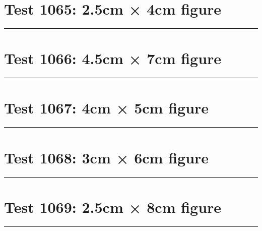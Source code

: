 \documentclass[a4paper,11pt]{article}
\begin{document}
\section*{Test 1065: 2.5cm × 4cm figure}
\begin{swarmwrap}%
  \begin{minipage}[t]{2cm}
    \centering
    \rule{\linewidth}{4cm}
  \end{minipage}%
\end{swarmwrap}%
\swarmwrapnext
\lipsum[101]
\lipsum[102]
\lipsum[103]
\section*{Test 1066: 4.5cm × 7cm figure}
\begin{swarmwrap}%
  \begin{minipage}[t]{4cm}
    \centering
    \rule{\linewidth}{7cm}
  \end{minipage}%
\end{swarmwrap}%
\swarmwrapnext
\lipsum[109]
\lipsum[110]
\lipsum[111]
\lipsum[112]
\lipsum[113]
\lipsum[114]
\section*{Test 1067: 4cm × 5cm figure}
\begin{swarmwrap}%
  \begin{minipage}[t]{4cm}
    \centering
    \rule{\linewidth}{5cm}
  \end{minipage}%
\end{swarmwrap}%
\swarmwrapnext
\lipsum[103]
\lipsum[104]
\lipsum[105]
\lipsum[106]
\lipsum[107]
\section*{Test 1068: 3cm × 6cm figure}
\begin{swarmwrap}%
  \begin{minipage}[t]{3cm}
    \centering
    \rule{\linewidth}{6cm}
  \end{minipage}%
\end{swarmwrap}%
\swarmwrapnext
\lipsum[36]
\lipsum[37]
\lipsum[38]
\lipsum[39]
\lipsum[40]
\lipsum[41]
\section*{Test 1069: 2.5cm × 8cm figure}
\begin{swarmwrap}%
  \begin{minipage}[t]{2cm}
    \centering
    \rule{\linewidth}{8cm}
  \end{minipage}%
\end{swarmwrap}%
\swarmwrapnext
\lipsum[142]
\lipsum[143]
\lipsum[144]
\lipsum[145]
\lipsum[146]
\end{document}
